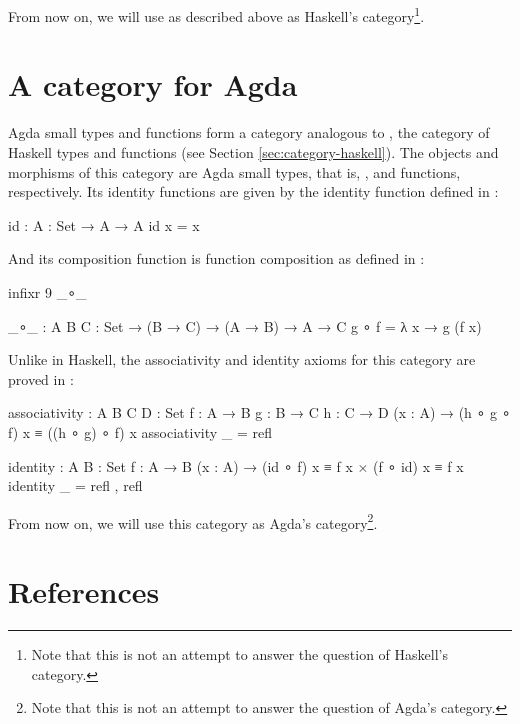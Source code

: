 From now on, we will use \hask as described above as Haskell's
category\footnote{Note that this is not an attempt to answer the
  question of Haskell's category.}.


\section{A category for Agda}
\label{sec:category-agda}

Agda small types and functions form a category analogous to \hask, the
category of Haskell types and functions (see Section
\ref{sec:category-haskell}). The objects and morphisms of this
category are Agda small types, that is, , and functions,
respectively. Its identity functions are given by the identity
function defined in :
\begin{codeagda}
id : {A : Set} → A → A
id x = x
\end{codeagda}
And its composition function is function composition as defined in
:
\begin{codeagda}
infixr 9 _∘_

_∘_ : {A B C : Set} → (B → C) → (A → B) → A → C
g ∘ f = λ x → g (f x)
\end{codeagda}
Unlike in Haskell, the associativity and identity axioms for this
category are proved in :
\begin{codeagda}
associativity : {A B C D : Set} {f : A → B} {g : B → C} {h : C → D}
                (x : A) → (h ∘ g ∘ f) x ≡ ((h ∘ g) ∘ f) x
associativity _ = refl

identity : {A B : Set} {f : A → B}
           (x : A) → (id ∘ f) x ≡ f x × (f ∘ id) x ≡ f x
identity _ = refl , refl
\end{codeagda}

From now on, we will use this category as Agda's
category\footnote{Note that this is not an attempt to answer the
  question of Agda's category.}.

\section{References}
\label{sec:categories-references}

